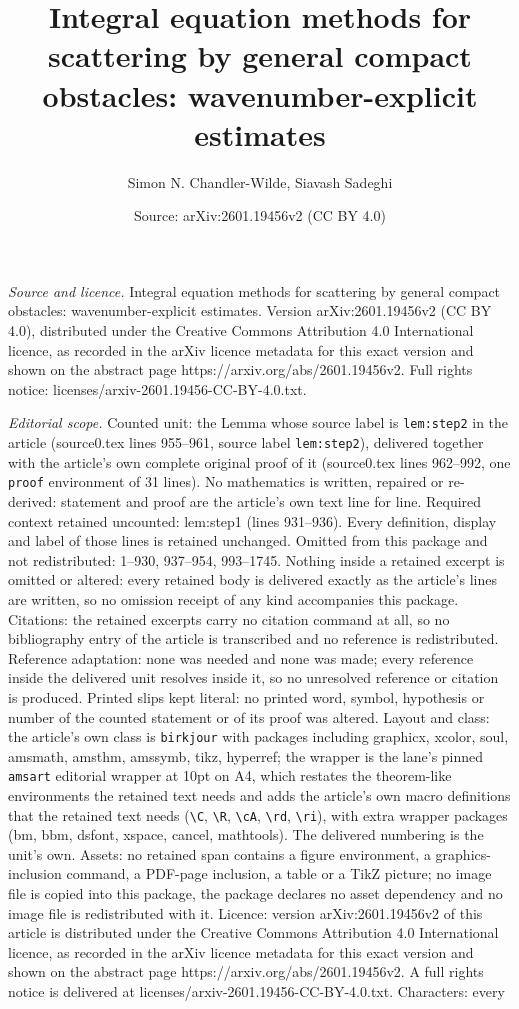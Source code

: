 \documentclass[10pt,a4paper]{amsart}
\title[Integral equation methods for scattering by general compact ]{Integral equation methods for scattering by general compact obstacles: wavenumber-explicit estimates}
\author{Simon N. Chandler-Wilde, Siavash Sadeghi}
\date{Source: arXiv:2601.19456v2 (CC BY 4.0)}
\begin{document}
\maketitle

\noindent\emph{Source and licence.} Integral equation methods for scattering by general compact obstacles: wavenumber-explicit estimates. Version arXiv:2601.19456v2 (CC BY 4.0), distributed under the Creative Commons Attribution 4.0 International licence, as recorded in the arXiv licence metadata for this exact version and shown on the abstract page https://arxiv.org/abs/2601.19456v2. Full rights notice: licenses/arxiv-2601.19456-CC-BY-4.0.txt.\par\smallskip

\noindent\textit{Editorial scope.} Counted unit: the Lemma whose source label is \texttt{lem:step2} in the article (source0.tex lines 955--961, source label \texttt{lem:step2}), delivered together with the article's own complete original proof of it (source0.tex lines 962--992, one \texttt{proof} environment of 31 lines). No mathematics is written, repaired or re-derived: statement and proof are the article's own text line for line. Required context retained uncounted: lem:step1 (lines 931--936). Every definition, display and label of those lines is retained unchanged. Omitted from this package and not redistributed: 1--930, 937--954, 993--1745. Nothing inside a retained excerpt is omitted or altered: every retained body is delivered exactly as the article's lines are written, so no omission receipt of any kind accompanies this package. Citations: the retained excerpts carry no citation command at all, so no bibliography entry of the article is transcribed and no reference is redistributed. Reference adaptation: none was needed and none was made; every reference inside the delivered unit resolves inside it, so no unresolved reference or citation is produced. Printed slips kept literal: no printed word, symbol, hypothesis or number of the counted statement or of its proof was altered. Layout and class: the article's own class is \texttt{birkjour} with packages including graphicx, xcolor, soul, amsmath, amsthm, amssymb, tikz, hyperref; the wrapper is the lane's pinned \texttt{amsart} editorial wrapper at 10pt on A4, which restates the theorem-like environments the retained text needs and adds the article's own macro definitions that the retained text needs (\texttt{\textbackslash C}, \texttt{\textbackslash R}, \texttt{\textbackslash cA}, \texttt{\textbackslash rd}, \texttt{\textbackslash ri}), with extra wrapper packages (bm, bbm, dsfont, xspace, cancel, mathtools). The delivered numbering is the unit's own. Assets: no retained span contains a figure environment, a graphics-inclusion command, a PDF-page inclusion, a table or a TikZ picture; no image file is copied into this package, the package declares no asset dependency and no image file is redistributed with it. Licence: version arXiv:2601.19456v2 of this article is distributed under the Creative Commons Attribution 4.0 International licence, as recorded in the arXiv licence metadata for this exact version and shown on the abstract page https://arxiv.org/abs/2601.19456v2. A full rights notice is delivered at licenses/arxiv-2601.19456-CC-BY-4.0.txt. Characters: every 
\end{document}
